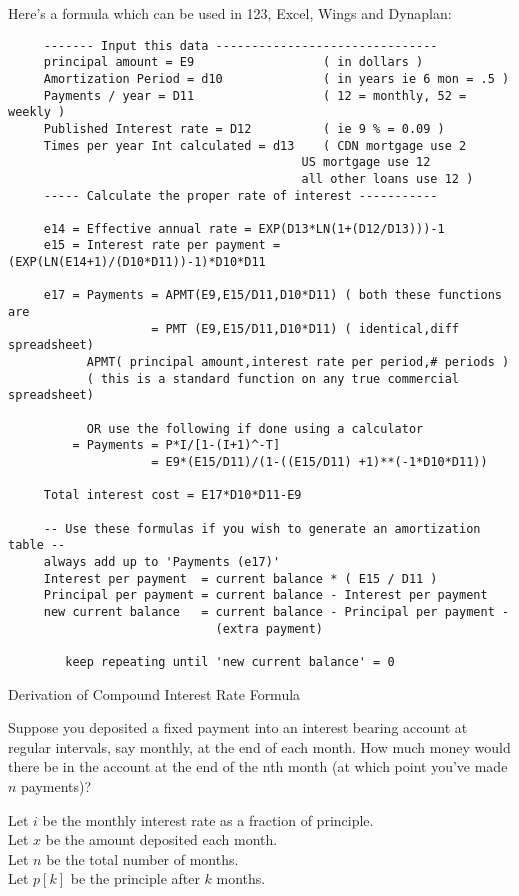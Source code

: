 Here's a formula which can be used in 123, Excel, Wings and Dynaplan:

\begin{verbatim}
     ------- Input this data -------------------------------
     principal amount = E9                  ( in dollars )
     Amortization Period = d10              ( in years ie 6 mon = .5 )
     Payments / year = D11                  ( 12 = monthly, 52 = weekly )
     Published Interest rate = D12          ( ie 9 % = 0.09 )
     Times per year Int calculated = d13    ( CDN mortgage use 2
                                         US mortgage use 12
                                         all other loans use 12 )
     ----- Calculate the proper rate of interest -----------

     e14 = Effective annual rate = EXP(D13*LN(1+(D12/D13)))-1
     e15 = Interest rate per payment = (EXP(LN(E14+1)/(D10*D11))-1)*D10*D11

     e17 = Payments = APMT(E9,E15/D11,D10*D11) ( both these functions are
                    = PMT (E9,E15/D11,D10*D11) ( identical,diff spreadsheet)
           APMT( principal amount,interest rate per period,# periods )
           ( this is a standard function on any true commercial spreadsheet)

           OR use the following if done using a calculator
         = Payments = P*I/[1-(I+1)^-T]
                    = E9*(E15/D11)/(1-((E15/D11) +1)**(-1*D10*D11))

     Total interest cost = E17*D10*D11-E9

     -- Use these formulas if you wish to generate an amortization table --
     always add up to 'Payments (e17)'
     Interest per payment  = current balance * ( E15 / D11 )
     Principal per payment = current balance - Interest per payment
     new current balance   = current balance - Principal per payment -
                             (extra payment)

        keep repeating until 'new current balance' = 0

\end{verbatim}

Derivation of Compound Interest Rate Formula

Suppose you deposited a fixed payment into an interest bearing account
at regular intervals, say monthly, at the end of each month.  How much
money would there be in the account at the end of the nth month (at
which point you've made $n$ payments)?

\noindent Let $i$ be the monthly interest rate as a fraction of
principle.\\
Let $x$ be the amount deposited each month.\\
Let $n$ be the total number of months.\\
Let $p[k]$ be the principle after $k$ months.\\

